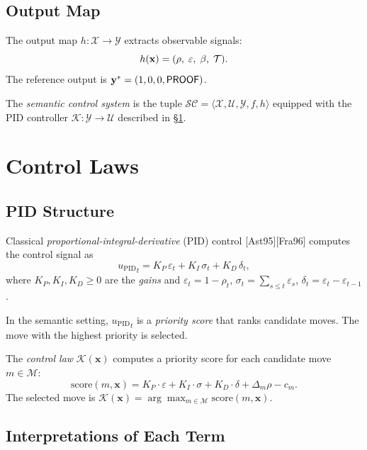 \documentclass[11pt]{article}
\newcommand{\SC}{\mathcal{SC}}              %
\newcommand{\CL}{\mathcal{K}}              %
\newcommand{\xstate}{\mathbf{x}}           %
\newcommand{\yout}{\mathbf{y}}             %
\newcommand{\vcov}{\rho}                   %
\newcommand{\vgap}{\varepsilon}            %
\newcommand{\vint}{\sigma}                 %
\newcommand{\vdiff}{\delta}                %
\newcommand{\Kp}{K_P}                      %
\newcommand{\Ki}{K_I}                      %
\newcommand{\Kd}{K_D}                      %
\newcommand{\vpid}{{u_{\mathrm{PID}}}}       %
\newcommand{\Xsp}{\mathcal{X}}            %
\newcommand{\Usp}{\mathcal{U}}            %
\newcommand{\Ysp}{\mathcal{Y}}            %
\newcommand{\obcount}{\beta}              %
\newcommand{\SCSys}{\langle \Xsp, \Usp, \Ysp, f, h \rangle}
\newcommand{\moves}{\mathcal{M}}           %
\newcommand{\citeAst}{[Ast95]}
\newcommand{\citeFra}{[Fra96]}
\begin{document}
\subsection{Output Map}

The output map $h : \Xsp \to \Ysp$ extracts observable signals:
\[
  h(\xstate) = (\vcov,\; \vgap,\; \obcount,\; \trust).
\]
The reference output is $\yout^* = (1, 0, 0, \Tproof)$.

\begin{definition}
  The \emph{semantic control system} is the tuple
  $\SC = \SCSys$ equipped with the PID controller
  $\CL : \Ysp \to \Usp$ described in \S\ref{sec:controllaw}.
\end{definition}

\section{Control Laws}
\label{sec:controllaw}

\subsection{PID Structure}

Classical \emph{proportional-integral-derivative} (PID) control
\citeAst{}\citeFra{} computes the control signal as
\[
  \vpid_t
    = \Kp\,\vgap_t
    + \Ki\,\vint_t
    + \Kd\,\vdiff_t,
\]
where $\Kp, \Ki, \Kd \geq 0$ are the \emph{gains} and
$\vgap_t = 1 - \vcov_t$,
$\vint_t = \sum_{s \leq t}\vgap_s$,
$\vdiff_t = \vgap_t - \vgap_{t-1}$.

In the semantic setting, $\vpid_t$ is a \emph{priority score} that
ranks candidate moves.  The move with the highest priority is selected.

\begin{definition}
  The \emph{control law} $\CL(\xstate)$ computes a priority score for
  each candidate move $m \in \moves$:
  \[
    \mathrm{score}(m, \xstate)
      = \Kp \cdot \vgap + \Ki \cdot \vint + \Kd \cdot \vdiff
        + \Delta_m\vcov - c_m.
  \]
  The selected move is
  $\CL(\xstate) = \arg\max_{m \in \moves} \mathrm{score}(m, \xstate)$.
\end{definition}

\subsection{Interpretations of Each Term}
\end{document}
